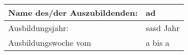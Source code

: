 
	\begin{center}
		\begin{tabular}{ | m{15em} | m{21em} | }
		\hline
		Name des/der Auszubildenden: & ad \\ \hline
		Ausbildungsjahr: & sasd Jahr \\ \hline
		Ausbildungswoche vom & a bis a \\ \hline
		\end{tabular}
	\end{center}
